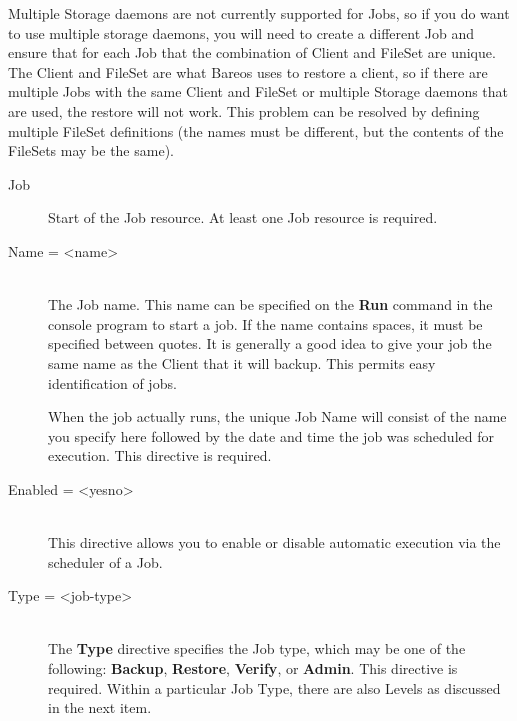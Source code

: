 Multiple Storage daemons are not currently supported for Jobs, so if
you do want to use multiple storage daemons, you will need to create
a different Job and ensure that for each Job that the combination of
Client and FileSet are unique.  The Client and FileSet are what Bareos
uses to restore a client, so if there are multiple Jobs with the same
Client and FileSet or multiple Storage daemons that are used, the
restore will not work.  This problem can be resolved by defining multiple
FileSet definitions (the names must be different, but the contents of
the FileSets may be the same).



\begin{description}

\item [Job]
Start of the Job resource. At least one Job  resource is required.

\item [Name = {\textless}name{\textgreater}] \hfill \\
The Job name. This name can be specified  on the {\bf Run} command in the
console program to start a job. If the  name contains spaces, it must be
specified between quotes. It is  generally a good idea to give your job the
same name as the Client  that it will backup. This permits easy
identification of jobs.

When the job actually runs, the unique Job Name will consist  of the name you
specify here followed by the date and time the  job was scheduled for
execution. This directive is required.

\item [Enabled = {\textless}yes{\textbar}no{\textgreater}] \hfill \\
  This directive allows you to enable or disable automatic execution
  via the scheduler of a Job.

\item [Type = {\textless}job-type{\textgreater}] \hfill \\
The {\bf Type} directive specifies  the Job type, which may be one of the
following: {\bf Backup},  {\bf Restore}, {\bf Verify}, or {\bf Admin}. This
directive  is required. Within a particular Job Type, there are also Levels
as discussed in the next item.


\end{description}
